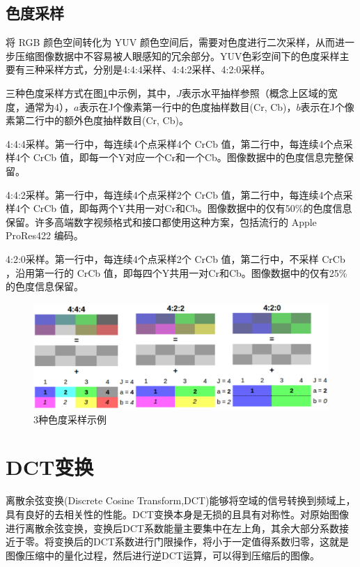 \subsection{色度采样}
将 RGB 颜色空间转化为 YUV 颜色空间后，需要对色度进行二次采样，从而进一步压缩图像数据中不容易被人眼感知的冗余部分。YUV色彩空间下的色度采样主要有三种采样方式，分别是4:4:4采样、4:4:2采样、4:2:0采样。

三种色度采样方式在图\ref{Fig.chrominance_sample}中示例，其中，$J$表示水平抽样参照（概念上区域的宽度，通常为4），$a$表示在J个像素第一行中的色度抽样数目(Cr, Cb)，$b$表示在J个像素第二行中的额外色度抽样数目(Cr, Cb)。

4:4:4采样。第一行中，每连续4个点采样4个 CrCb 值，第二行中，每连续4个点采样4个 CrCb 值，即每一个Y对应一个Cr和一个Cb。图像数据中的色度信息完整保留。

4:4:2采样。第一行中，每连续4个点采样2个 CrCb 值，第二行中，每连续4个点采样4个 CrCb 值，即每两个Y共用一对Cr和Cb。图像数据中的仅有50\%的色度信息保留。许多高端数字视频格式和接口都使用这种方案，包括流行的 Apple ProRes422 编码\cite{AppleproResWhiteBook}。

4:2:0采样。第一行中，每连续4个点采样2个 CrCb 值，第二行中，不采样 CrCb ，沿用第一行的 CrCb 值，即每四个Y共用一对Cr和Cb。图像数据中的仅有25\%的色度信息保留。


\begin{figure}[!htb]
    \centering
    \includegraphics[width=1.0\textwidth]{pages/jpeg/chrominance_sample.png}
    \caption{3种色度采样示例}
    \label{Fig.chrominance_sample}
\end{figure}


\section{DCT变换}
离散余弦变换(Discrete Cosine Transform,DCT)能够将空域的信号转换到频域上，具有良好的去相关性的性能。DCT变换本身是无损的且具有对称性。对原始图像进行离散余弦变换，变换后DCT系数能量主要集中在左上角，其余大部分系数接近于零。将变换后的DCT系数进行门限操作，将小于一定值得系数归零，这就是图像压缩中的量化过程，然后进行逆DCT运算，可以得到压缩后的图像。

